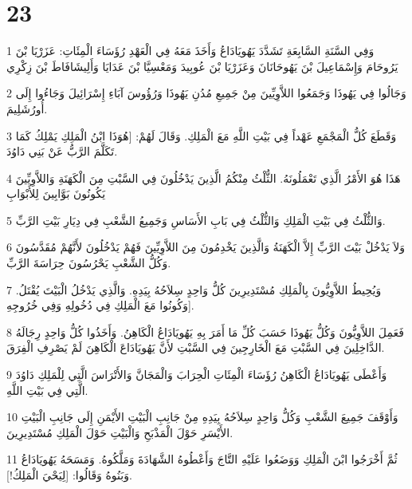 \chapter{23}

\par 1 وَفِي السَّنَةِ السَّابِعَةِ تَشَدَّدَ يَهُويَادَاعُ وَأَخَذَ مَعَهُ فِي الْعَهْدِ رُؤَسَاءَ الْمِئَاتِ: عَزَرْيَا بْنَ يَرُوحَامَ وَإِسْمَاعِيلَ بْنَ يَهُوحَانَانَ وَعَزَرْيَا بْنَ عُوبِيدَ وَمَعْسِيَّا بْنَ عَدَايَا وَأَلِيشَافَاطَ بْنَ زِكْرِي
\par 2 وَجَالُوا فِي يَهُوذَا وَجَمَعُوا اللاَّوِيِّينَ مِنْ جَمِيعِ مُدُنِ يَهُوذَا وَرُؤُوسَ آبَاءِ إِسْرَائِيلَ وَجَاءُوا إِلَى أُورُشَلِيمَ.
\par 3 وَقَطَعَ كُلُّ الْمَجْمَعِ عَهْداً فِي بَيْتِ اللَّهِ مَعَ الْمَلِكِ. وَقَالَ لَهُمْ: [هُوَذَا ابْنُ الْمَلِكِ يَمْلِكُ كَمَا تَكَلَّمَ الرَّبُّ عَنْ بَنِي دَاوُدَ.
\par 4 هَذَا هُوَ الأَمْرُ الَّذِي تَعْمَلُونَهُ. الثُّلْثُ مِنْكُمُ الَّذِينَ يَدْخُلُونَ فِي السَّبْتِ مِنَ الْكَهَنَةِ وَاللاَّوِيِّينَ يَكُونُونَ بَوَّابِينَ لِلأَبْوَابِ
\par 5 وَالثُّلْثُ فِي بَيْتِ الْمَلِكِ وَالثُّلْثُ فِي بَابِ الأَسَاسِ وَجَمِيعُ الشَّعْبِ فِي دِيَارِ بَيْتِ الرَّبِّ.
\par 6 وَلاَ يَدْخُلْ بَيْتَ الرَّبِّ إِلاَّ الْكَهَنَةُ وَالَّذِينَ يَخْدِمُونَ مِنَ اللاَّوِيِّينَ فَهُمْ يَدْخُلُونَ لأَنَّهُمْ مُقَدَّسُونَ وَكُلُّ الشَّعْبِ يَحْرُسُونَ حِرَاسَةَ الرَّبِّ.
\par 7 وَيُحِيطُ اللاَّوِيُّونَ بِالْمَلِكِ مُسْتَدِيرِينَ كُلُّ وَاحِدٍ سِلاَحُهُ بِيَدِهِ. وَالَّذِي يَدْخُلُ الْبَيْتَ يُقْتَلُ. وَكُونُوا مَعَ الْمَلِكِ فِي دُخُولِهِ وَفِي خُرُوجِهِ].
\par 8 فَعَمِلَ اللاَّوِيُّونَ وَكُلُّ يَهُوذَا حَسَبَ كُلِّ مَا أَمَرَ بِهِ يَهُويَادَاعُ الْكَاهِنُ. وَأَخَذُوا كُلُّ وَاحِدٍ رِجَالَهُ الدَّاخِلِينَ فِي السَّبْتِ مَعَ الْخَارِجِينَ فِي السَّبْتِ لأَنَّ يَهُويَادَاعَ الْكَاهِنَ لَمْ يَصْرِفِ الْفِرَقَ.
\par 9 وَأَعْطَى يَهُويَادَاعُ الْكَاهِنُ رُؤَسَاءَ الْمِئَاتِ الْحِرَابَ وَالْمَجَانَّ وَالأَتْرَاسَ الَّتِي لِلْمَلِكِ دَاوُدَ الَّتِي فِي بَيْتِ اللَّهِ.
\par 10 وَأَوْقَفَ جَمِيعَ الشَّعْبِ وَكُلُّ وَاحِدٍ سِلاَحُهُ بِيَدِهِ مِنْ جَانِبِ الْبَيْتِ الأَيْمَنِ إِلَى جَانِبِ الْبَيْتِ الأَيْسَرِ حَوْلَ الْمَذْبَحِ وَالْبَيْتِ حَوْلَ الْمَلِكِ مُسْتَدِيرِينَ.
\par 11 ثُمَّ أَخْرَجُوا ابْنَ الْمَلِكِ وَوَضَعُوا عَلَيْهِ التَّاجَ وَأَعْطُوهُ الشَّهَادَةَ وَمَلَّكُوهُ. وَمَسَحَهُ يَهُويَادَاعُ وَبَنُوهُ وَقَالُوا: [لِيَحْيَ الْمَلِكُ!].
